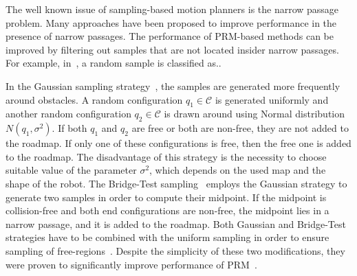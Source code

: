 \documentclass[letterpaper, 10 pt, conference]{ieeeconf} %
\def\C{\mathcal{C}}
\begin{document}


The well known issue of sampling-based motion planners is the narrow passage problem. 
Many approaches have been proposed to improve performance in the presence of narrow passages.
The performance of PRM-based methods can be improved by filtering out samples that are not located insider narrow passages.
For example, in~\cite{hsuBridge}, a random sample is classified as..

In the Gaussian sampling strategy~\cite{overmarsGauss}, the samples are generated more frequently around obstacles.
A random configuration $q_1\in\C$ is generated uniformly and another random configuration
$q_2\in\C$ is drawn around using Normal distribution $N(q_1,\sigma^2)$.
If both $q_1$ and $q_2$ are free or both are non-free, they are not added to the roadmap. 
If only one of these configurations is free, then the free one is added to the roadmap. 
The disadvantage of this strategy is the necessity to choose suitable value of the parameter $\sigma^2$, which depends
on the used map and the shape of the robot.
The Bridge-Test sampling~\cite{hsuBridge} employs the Gaussian strategy to generate two samples in order to compute their midpoint.
If the midpoint is collision-free and both end configurations are non-free, the midpoint lies in a narrow passage, and it is added to the roadmap.
Both Gaussian and Bridge-Test strategies have to be combined with the uniform sampling in order to ensure sampling of free-regions~\cite{sun2005narrow}.
Despite the simplicity of these two modifications, they were proven to significantly improve performance of PRM~\cite{hsuOnProb,geraertsRA,geraertsPRMA,wang10adaptive}.
\end{document}
